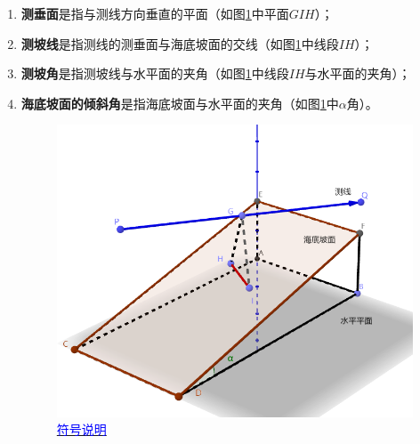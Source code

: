 \begin{enumerate}
    \item \textbf{测垂面}是指与测线方向垂直的平面（如图\ref{fig:符号说明}中平面$GIH$）；
    \item \textbf{测坡线}是指测线的测垂面与海底坡面的交线（如图\ref{fig:符号说明}中线段$IH$）；
    \item \textbf{测坡角}是指测坡线与水平面的夹角（如图\ref{fig:符号说明}中线段$IH$与水平面的夹角）；
    \item \textbf{海底坡面的倾斜角}是指海底坡面与水平面的夹角（如图\ref{fig:符号说明}中$\alpha$角）。\newline

    \begin{figure}[h]
        \centering
        \includegraphics[scale=0.4]{res/img/符号说明.png}
        \caption{\href{https://www.geogebra.org/m/ftk9cu9v}{\textcolor{blue}{符号说明}}}
        \label{fig:符号说明}
    \end{figure}
    
\end{enumerate}



\begin{table}[h]
    \centering

    \renewcommand\arraystretch{1.5}
    
\end{table}
